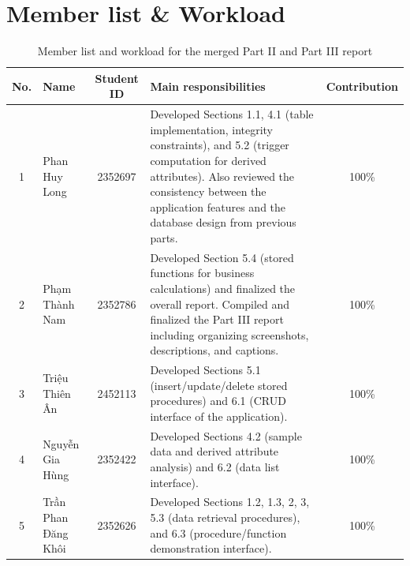 \documentclass[twoside]{hcmut-report}
\begin{document}
\section*{Member list \& Workload}
\begin{center}
\begin{table}[h]
\renewcommand\thetable{1}
\centering
\small
\begin{tabular}{|c|l|c|p{7cm}|c|}
\hline
\textbf{No.} & \textbf{Name} & \textbf{Student ID} &
\textbf{Main responsibilities} & \textbf{Contribution} \\
\hline
1 & Phan Huy Long & 2352697 &
Developed Sections 1.1, 4.1 (table implementation, integrity constraints), and 5.2 (trigger computation for derived attributes). Also reviewed the consistency between the application features and the database design from previous parts.
& 100\% \\
\hline
2 & Phạm Thành Nam & 2352786 &
Developed Section 5.4 (stored functions for business calculations) and finalized the overall report. Compiled and finalized the Part III report including organizing screenshots, descriptions, and captions.
& 100\% \\
\hline
3 & Triệu Thiên Ân & 2452113 &
Developed Sections 5.1 (insert/update/delete stored procedures) and 6.1 (CRUD interface of the application).
& 100\% \\
\hline
4 & Nguyễn Gia Hùng & 2352422 &
Developed Sections 4.2 (sample data and derived attribute analysis) and 6.2 (data list interface).
& 100\% \\
\hline
5 & Trần Phan Đăng Khôi & 2352626 &
Developed Sections 1.2, 1.3, 2, 3, 5.3 (data retrieval procedures), and 6.3 (procedure/function demonstration interface).
& 100\% \\
\hline
\end{tabular}
\caption{Member list and workload for the merged Part II and Part III report}
\label{tab:member-workload-merged}
\end{table}
\end{center}
\clearpage


\tableofcontents

\clearpage






\end{document}
